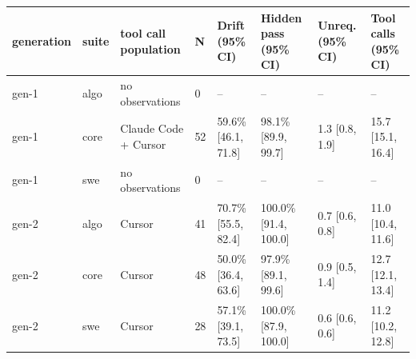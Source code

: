 \begin{tabular}{llllllll}
\toprule
generation & suite & tool call population & N & Drift (95\% CI) & Hidden pass (95\% CI) & Unreq. (95\% CI) & Tool calls (95\% CI) \\
\midrule
gen-1 & algo & no observations & 0 & -- & -- & -- & -- \\
gen-1 & core & Claude Code + Cursor & 52 & 59.6\% [46.1, 71.8] & 98.1\% [89.9, 99.7] & 1.3 [0.8, 1.9] & 15.7 [15.1, 16.4] \\
gen-1 & swe & no observations & 0 & -- & -- & -- & -- \\
gen-2 & algo & Cursor & 41 & 70.7\% [55.5, 82.4] & 100.0\% [91.4, 100.0] & 0.7 [0.6, 0.8] & 11.0 [10.4, 11.6] \\
gen-2 & core & Cursor & 48 & 50.0\% [36.4, 63.6] & 97.9\% [89.1, 99.6] & 0.9 [0.5, 1.4] & 12.7 [12.1, 13.4] \\
gen-2 & swe & Cursor & 28 & 57.1\% [39.1, 73.5] & 100.0\% [87.9, 100.0] & 0.6 [0.6, 0.6] & 11.2 [10.2, 12.8] \\
\bottomrule
\end{tabular}
